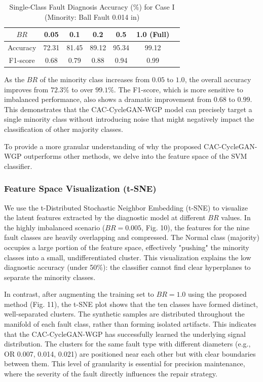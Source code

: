 \begin{table}[htbp]
\centering
\caption{Single-Class Fault Diagnosis Accuracy (\%) for Case I (Minority: Ball Fault 0.014 in)}
\label{tab:single_case1}
\begin{tabular}{ccccccc}
\hline
$BR$ & 0.05 & 0.1 & 0.2 & 0.5 & 1.0 (Full) \\ \hline
Accuracy & 72.31 & 81.45 & 89.12 & 95.34 & 99.12 \\
F1-score & 0.68  & 0.79  & 0.88  & 0.94  & 0.99 \\
\hline
\end{tabular}
\end{table}

As the $BR$ of the minority class increases from $0.05$ to $1.0$, the overall accuracy improves from $72.3\%$ to over $99.1\%$. The F1-score, which is more sensitive to imbalanced performance, also shows a dramatic improvement from $0.68$ to $0.99$. This demonstrates that the CAC-CycleGAN-WGP model can precisely target a single minority class without introducing noise that might negatively impact the classification of other majority classes.

To provide a more granular understanding of why the proposed CAC-CycleGAN-WGP outperforms other methods, we delve into the feature space of the SVM classifier.

\subsubsection{Feature Space Visualization (t-SNE)}
We use the t-Distributed Stochastic Neighbor Embedding (t-SNE) to visualize the latent features extracted by the diagnostic model at different $BR$ values. In the highly imbalanced scenario ($BR=0.005$, Fig. 10), the features for the nine fault classes are heavily overlapping and compressed. The Normal class (majority) occupies a large portion of the feature space, effectively "pushing" the minority classes into a small, undifferentiated cluster. This visualization explains the low diagnostic accuracy (under 50\%): the classifier cannot find clear hyperplanes to separate the minority classes.

In contrast, after augmenting the training set to $BR=1.0$ using the proposed method (Fig. 11), the t-SNE plot shows that the ten classes have formed distinct, well-separated clusters. The synthetic samples are distributed throughout the manifold of each fault class, rather than forming isolated artifacts. This indicates that the CAC-CycleGAN-WGP has successfully learned the underlying signal distribution. The clusters for the same fault type with different diameters (e.g., OR 0.007, 0.014, 0.021) are positioned near each other but with clear boundaries between them. This level of granularity is essential for precision maintenance, where the severity of the fault directly influences the repair strategy.

